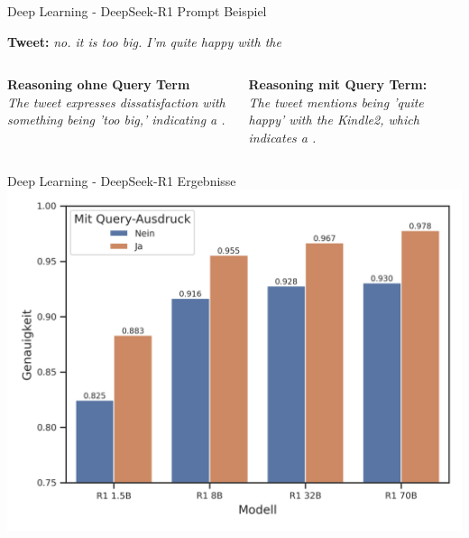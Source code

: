 \documentclass[aspectratio=169]{beamer}
\begin{document}
\begin{frame}{Deep Learning - DeepSeek-R1 Prompt Beispiel}
	\begin{center}
		\textbf{Tweet:} \glqq \textit{no. it is too big. I'm quite happy with the \grqq}
		\vspace{0.45cm}
		\begin{columns}
			\begin{column}{0.45\textwidth}
				\textbf{Reasoning ohne Query Term} \\
				\vspace{0.4cm}
				\glqq \textit{The tweet expresses dissatisfaction with something being 'too big,' indicating a .\grqq}
			\end{column}
			\begin{column}{0.45\textwidth}
				\textbf{Reasoning mit Query Term:} \\
				\vspace{0.4cm}
				\glqq \textit{The tweet mentions being 'quite happy' with the Kindle2, which indicates a .\grqq}
			\end{column}
		\end{columns}
	\end{center}

\end{frame}

\begin{frame}{Deep Learning - DeepSeek-R1 Ergebnisse}
	\centering
	\includegraphics[scale=0.65]{../datasets/sentiment140/results/plots/deepseek-genauigkeit-deepseek-modelle-einfluss-query-ausdruck-truncated-y-axis.png}
\end{frame}
\end{document}
